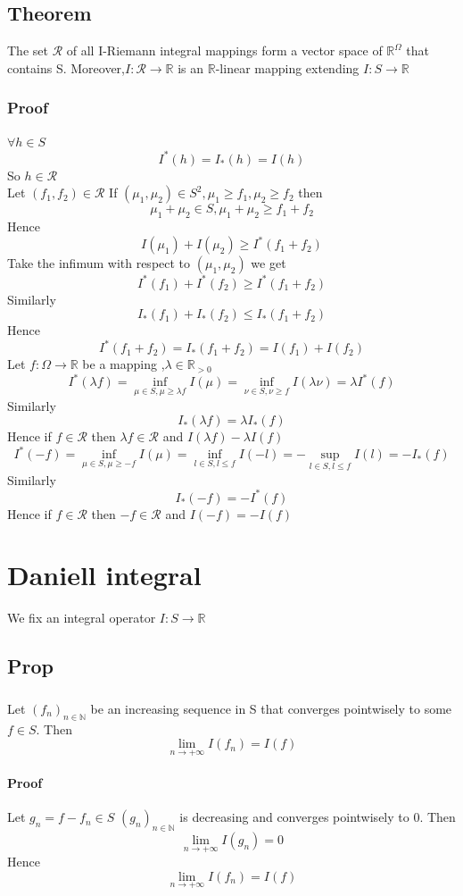 \documentclass{book}
\begin{document}
\section{Theorem} The set $\mathscr{R}$ of all I-Riemann integral mappings form a vector space of $\mathbb{R}^\Omega$ that contains S. Moreover,$I:\mathscr{R}\rightarrow \mathbb{R}$ is an $\mathbb{R}$-linear mapping extending $I:S\rightarrow\mathbb{R}$
\subsection*{Proof}
$\forall h\in S$$$I^*(h)=I_*(h)=I(h)$$
So $h\in \mathscr{R}$\\
Let $(f_1,f_2)\in \mathscr{R}$ If $(\mu_1,\mu_2)\in S^2,\mu_1\geq f_1,\mu_2\geq f_2$
then $$\mu_1+\mu_2\in S,\mu_1+\mu_2\geq f_1+f_2$$
Hence
$$I(\mu_1)+I(\mu_2)\geq I^*(f_1+f_2)$$
Take the infimum with respect to $(\mu_1,\mu_2)$ we get 
$$I^*(f_1)+I^*(f_2)\geq I^*(f_1+f_2)$$
Similarly
$$I_*(f_1)+I_*(f_2)\leq I_*(f_1+f_2)$$
Hence
$$I^*(f_1+f_2)=I_*(f_1+f_2)=I(f_1)+I(f_2)$$
Let $f:\Omega\rightarrow\mathbb{R}$ be a mapping ,$\lambda\in \mathbb{R}_{>0}$
$$I^*(\lambda f)=\inf\limits_{\mu\in S,\mu\geq \lambda f}I(\mu)=\inf\limits_{\nu\in S,\nu\geq f}I(\lambda\nu)=\lambda I^*(f)$$
Similarly
$$I_*(\lambda f)=\lambda I_*(f)$$
Hence if $f\in \mathscr{R}$ then $\lambda f\in \mathscr{R}$ and $I(\lambda f)-\lambda I(f)$
$$I^*(-f)=\inf\limits_{\mu\in S,\mu\geq-f}I(\mu)=\inf\limits_{l\in S,l\leq f}I(-l)=-\sup\limits_{l\in S,l\leq f}I(l)=-I_*(f)$$
Similarly
$$I_*(-f)=-I^*(f)$$Hence if $f\in \mathscr{R}$ then $-f\in \mathscr{R}$ and $I(-f)=-I(f)$
\chapter{Daniell integral}
We fix an integral operator $I:S\rightarrow\mathbb{R}$
\section{Prop}
\subsection{}
Let $(f_n)_{n\in \mathbb{N}}$ be an increasing sequence in S that converges pointwisely to some $f\in S$. Then $$\lim\limits_{n\rightarrow+\infty}I(f_n)=I(f)$$

\subsubsection*{Proof}
Let $g_n=f-f_n\in S$ $(g_n)_{n\in \mathbb{N}}$ is decreasing and converges pointwisely to 0. Then $$\lim\limits_{n\rightarrow+\infty}I(g_n)=0$$
Hence $$\lim\limits_{n\rightarrow+\infty}I(f_n)=I(f)$$
\end{document}
